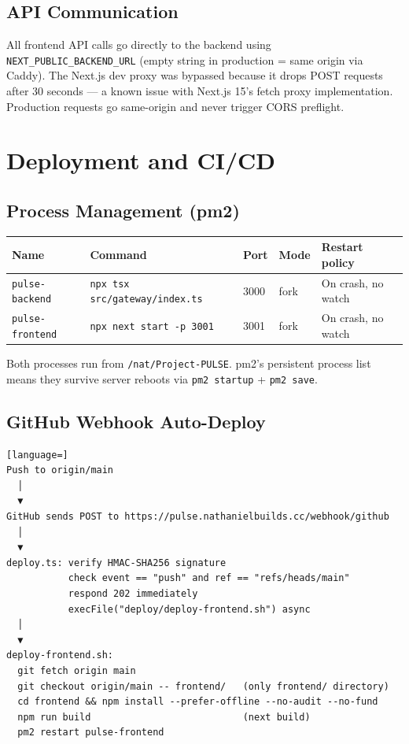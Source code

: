 \documentclass[12pt,a4paper]{article}
\begin{document}
\subsection{API Communication}

All frontend API calls go directly to the backend using \texttt{NEXT\_PUBLIC\_BACKEND\_URL}
(empty string in production = same origin via Caddy). The Next.js dev proxy was
bypassed because it drops POST requests after 30 seconds — a known issue with
Next.js 15's fetch proxy implementation. Production requests go same-origin and
never trigger CORS preflight.

\section{Deployment and CI/CD}
\label{sec:deploy}

\subsection{Process Management (pm2)}

\begin{tabular}{@{}lllll@{}}
\toprule
\textbf{Name} & \textbf{Command} & \textbf{Port} & \textbf{Mode} & \textbf{Restart policy} \\
\midrule
\texttt{pulse-backend}  & \texttt{npx tsx src/gateway/index.ts} & 3000 & fork & On crash, no watch \\
\texttt{pulse-frontend} & \texttt{npx next start -p 3001}       & 3001 & fork & On crash, no watch \\
\bottomrule
\end{tabular}

Both processes run from \texttt{/nat/Project-PULSE}. pm2's persistent process list
means they survive server reboots via \texttt{pm2 startup} + \texttt{pm2 save}.

\subsection{GitHub Webhook Auto-Deploy}

\begin{lstlisting}[language=]
Push to origin/main
  │
  ▼
GitHub sends POST to https://pulse.nathanielbuilds.cc/webhook/github
  │
  ▼
deploy.ts: verify HMAC-SHA256 signature
           check event == "push" and ref == "refs/heads/main"
           respond 202 immediately
           execFile("deploy/deploy-frontend.sh") async
  │
  ▼
deploy-frontend.sh:
  git fetch origin main
  git checkout origin/main -- frontend/   (only frontend/ directory)
  cd frontend && npm install --prefer-offline --no-audit --no-fund
  npm run build                           (next build)
  pm2 restart pulse-frontend
\end{lstlisting}
\end{document}
